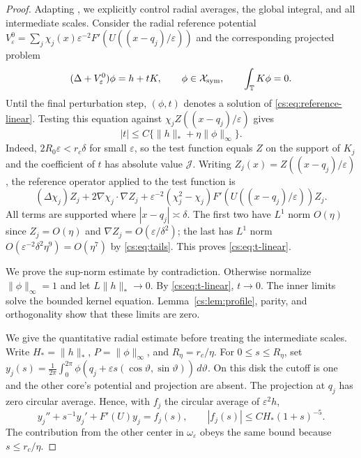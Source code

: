 \documentclass[11pt,reqno]{amsart}
\numberwithin{equation}{section}
\theoremstyle{definition}
\theoremstyle{remark}
\newcommand{\T}{\mathbb T}
\newcommand{\eps}{\varepsilon}
\begin{document}
\begin{proof}
Adapting \cite[Appendix~A]{LinYanAIHP}, we explicitly control
radial averages, the global integral, and all intermediate scales.
Consider the radial reference potential
\(
 V_\eps^0=\sum_j\chi_j(x)\eps^{-2}F'(U((x-q_j)/\eps))
\)
and the corresponding projected problem
\begin{equation}\label{cs:eq:reference-linear}
 (\Delta+V_\eps^0)\phi=h+tK,\qquad
 \phi\in\mathcal X_{\rm sym},\qquad \int_\T K\phi=0.
\end{equation}
Until the final perturbation step, $(\phi,t)$ denotes a solution of
\eqref{cs:eq:reference-linear}.
Testing this equation against $\chi_jZ((x-q_j)/\eps)$ gives
\begin{equation}\label{cs:eq:t-linear}
 |t|\le C\{\|h\|_*+\eta\|\phi\|_\infty\}.
\end{equation}
Indeed, $2R_0\eps<r_c\delta$ for small $\eps$, so the test
function equals $Z$ on the support of $K_j$ and the coefficient of
$t$ has absolute value $\mathcal J$. Writing $Z_j(x)=Z((x-q_j)/\eps)$,
the reference operator applied to the test function is
\[
 (\Delta\chi_j)Z_j+2\nabla\chi_j\cdot\nabla Z_j
       +\eps^{-2}(\chi_j^2-\chi_j)F'(U((x-q_j)/\eps))Z_j.
\]
All terms are supported where $|x-q_j|\asymp\delta$.
The first two have $L^1$ norm $O(\eta)$ since
$Z_j=O(\eta)$ and $\nabla Z_j=O(\eps/\delta^2)$; the last has
$L^1$ norm $O(\eps^{-2}\delta^2\eta^9)=O(\eta^7)$ by
\eqref{cs:eq:tails}. This proves \eqref{cs:eq:t-linear}.

We prove the sup-norm estimate by contradiction. Otherwise normalize
$\|\phi\|_\infty=1$ and let $L\|h\|_*\to0$. By
\eqref{cs:eq:t-linear}, $t\to0$. The inner limits solve the bounded
kernel equation. Lemma~\ref{cs:lem:profile}, parity, and orthogonality
show that these limits are zero.

We give the quantitative radial estimate before treating the
intermediate scales. Write $H_* = \|h\|_*$,
$P=\|\phi\|_\infty$, and $R_\eta=r_c/\eta$. For $0\le s\le R_\eta$, set
\(
 y_j(s)=\frac1{2\pi}\int_0^{2\pi}
       \phi(q_j+\eps s(\cos\vartheta,\sin\vartheta))\,d\vartheta.
\)
On this disk the cutoff is one and the other core's potential and
projection are absent. The projection at $q_j$ has zero circular
average. Hence, with $f_j$ the circular average of $\eps^2h$,
\begin{equation}\label{cs:eq:radial-forcing}
 y_j''+s^{-1}y_j'+F'(U)y_j=f_j(s),\qquad
 |f_j(s)|\le CH_*(1+s)^{-5}.
\end{equation}
The contribution from the other center in $\omega_\eps$ obeys the
same bound because $s\le r_c/\eta$.


\end{proof}
\end{document}
